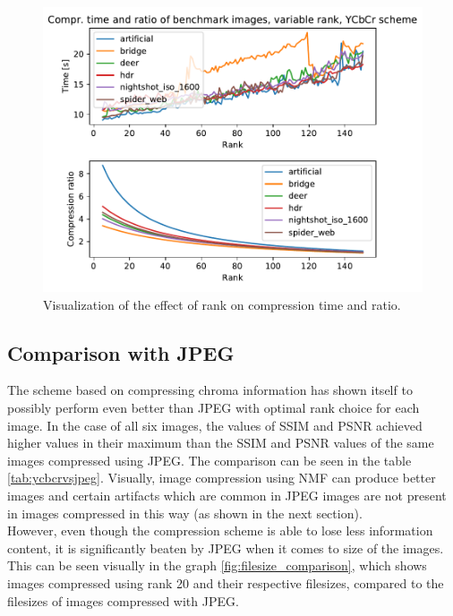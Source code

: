 \documentclass[thesis=M,english]{FITthesis}[2012/10/20]
\begin{document}
\begin{figure}[h]
  \centering
  \includegraphics[scale=0.8]{imgs/results/comprtimeratio_ycbcr}
  \caption{Visualization of the effect of rank on compression time and ratio.}
  \label{fig:comprtimeratio_ycbcr}
\end{figure}

\subsection{Comparison with JPEG}
The scheme based on compressing chroma information has shown itself to possibly
perform even better than JPEG with optimal rank choice for each image. In the case
of all six images, the values of SSIM and PSNR achieved higher values in their maximum than the SSIM and PSNR values
of the same images compressed using JPEG. The comparison can be seen in the table \ref{tab:ycbcrvsjpeg}.
Visually, image compression using NMF can produce better images and certain artifacts which are common
in JPEG images are not present in images compressed in this way (as shown in the next section).
\\

However, even though the compression scheme is able to lose less information content, it is significantly
beaten by JPEG when it comes to size of the images. This can be seen visually in the graph \ref{fig:filesize_comparison},
which shows images compressed using rank 20 and their respective filesizes, compared to the filesizes of images
compressed with JPEG.
\end{document}

